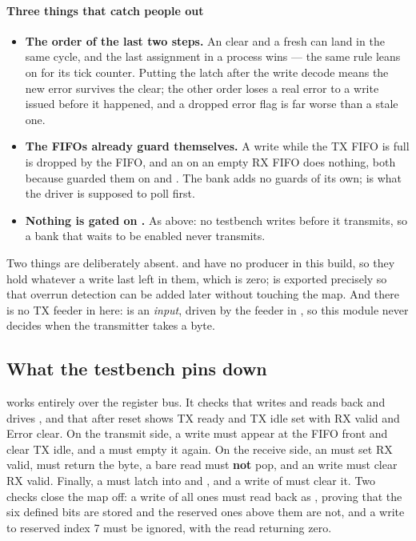 \paragraph{Three things that catch people out}
\begin{itemize}
  \item \textbf{The order of the last two steps.} An  clear and a fresh
     can land in the same cycle, and the last assignment in a process wins --- the
    same rule  leans on for its tick counter. Putting the latch after the write decode
    means the new error survives the clear; the other order loses a real error to a write issued
    before it happened, and a dropped error flag is far worse than a stale one.
  \item \textbf{The FIFOs already guard themselves.} A  write while the TX FIFO is
    full is dropped by the FIFO, and an  on an empty RX FIFO does nothing, both because
     guarded them on  and . The bank adds no guards of its
    own;  is what the driver is supposed to poll first.
  \item \textbf{Nothing is gated on .} As above: no testbench writes  before it transmits, so a bank that waits to be enabled never transmits.
\end{itemize}

Two things are deliberately absent.  and  have no producer in this
build, so they hold whatever a write last left in them, which is zero;  is exported
precisely so that overrun detection can be added later without touching the map. And there is no TX
feeder in here:  is an \emph{input}, driven by the feeder in , so this
module never decides when the transmitter takes a byte.

\subsection{What the testbench pins down}
\label{c5:sec:uart_regs_tb}
 works entirely over the register bus. It checks that  writes and
reads back and drives , and that  after reset shows TX ready and TX idle
set with RX valid and Error clear. On the transmit side, a  write must appear at the
FIFO front and clear TX idle, and a  must empty it again. On the receive side, an
 must set RX valid,  must return the byte, a bare  read
must \textbf{not} pop, and an  write must clear RX valid. Finally, a 
must latch into  and , and a write of  must clear it. Two
checks close the map off: a  write of all ones must read back as ,
proving that the six defined bits are stored and the reserved ones above them are not, and a write
to reserved index 7 must be ignored, with the read returning zero.

